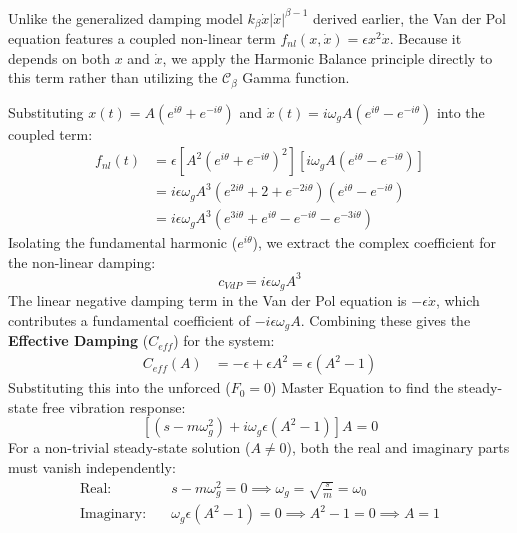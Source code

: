 \documentclass[10pt,twoside]{report}
\begin{document}
Unlike the generalized damping model $k_\beta \dot{x}|\dot{x}|^{\beta-1}$ derived earlier, the Van der Pol equation features a coupled non-linear term $f_{nl}(x, \dot{x}) = \epsilon x^2 \dot{x}$. Because it depends on both $x$ and $\dot{x}$, we apply the Harmonic Balance principle directly to this term rather than utilizing the $\mathcal{C}_\beta$ Gamma function.

Substituting $x(t) = A(e^{i\theta} + e^{-i\theta})$ and $\dot{x}(t) = i\omega_g A(e^{i\theta} - e^{-i\theta})$ into the coupled term:
\begin{align*}
    f_{nl}(t) &= \epsilon \left[ A^2(e^{i\theta} + e^{-i\theta})^2 \right] \left[ i\omega_g A(e^{i\theta} - e^{-i\theta}) \right] \\
              &= i\epsilon \omega_g A^3 \left( e^{2i\theta} + 2 + e^{-2i\theta} \right) \left( e^{i\theta} - e^{-i\theta} \right) \\
              &= i\epsilon \omega_g A^3 \left( e^{3i\theta} + e^{i\theta} - e^{-i\theta} - e^{-3i\theta} \right)
\end{align*}
Isolating the fundamental harmonic ($e^{i\theta}$), we extract the complex coefficient for the non-linear damping:
\begin{equation*}
    c_{VdP} = i\epsilon \omega_g A^3
\end{equation*}
The linear negative damping term in the Van der Pol equation is $-\epsilon \dot{x}$, which contributes a fundamental coefficient of $-i\epsilon \omega_g A$. Combining these gives the \textbf{Effective Damping} ($C_{eff}$) for the system:
\begin{align*}
    C_{eff}(A) &= -\epsilon + \epsilon A^2 = \epsilon(A^2 - 1)
\end{align*}
Substituting this into the unforced ($F_0=0$) Master Equation to find the steady-state free vibration response:
\begin{equation}
    \left[ (s - m\omega_g^2) + i \omega_g \epsilon(A^2 - 1) \right] A = 0
\end{equation}
For a non-trivial steady-state solution ($A \neq 0$), both the real and imaginary parts must vanish independently:
\begin{align*}
    \text{Real:} \quad & s - m\omega_g^2 = 0 \implies \omega_g = \sqrt{\frac{s}{m}} = \omega_0 \\
    \text{Imaginary:} \quad & \omega_g \epsilon(A^2 - 1) = 0 \implies A^2 - 1 = 0 \implies A = 1
\end{align*}
\end{document}
